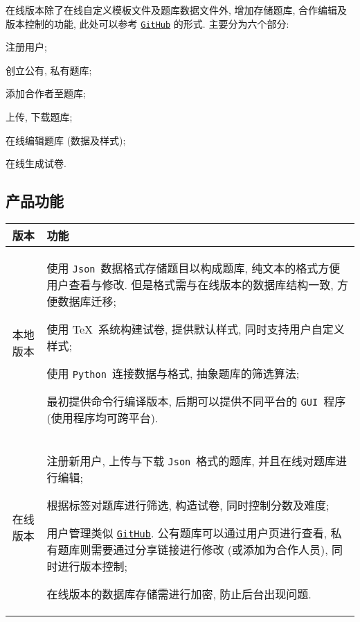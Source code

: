 \documentclass{ctexart}
\newcommand{\github}{\texttt{GitHub}}
\newcommand{\python}{\texttt{Python}}
\newcommand{\json}{\texttt{Json}}
\newcommand{\gui}{\texttt{GUI}}
\begin{document}
在线版本除了在线自定义模板文件及题库数据文件外, 增加存储题库, 合作编辑及版本控制的功能, 此处可以参考 \href{https://github.com/Iydon}{\github} 的形式. 主要分为六个部分: \begin{enumerate*}[label=\textbf{(\arabic*)}]
    \item 注册用户;
    \item 创立公有, 私有题库;
    \item 添加合作者至题库;
    \item 上传, 下载题库;
    \item 在线编辑题库 (数据及样式);
    \item 在线生成试卷.
\end{enumerate*}


\subsection{产品功能}
\begin{center}
    \begin{tabularx}{\textwidth}{cX}
        \toprule
            版本 & 功能 \\
        \midrule
        \rowcolor[HTML]{EFEFEF}
            本地版本 & \begin{itemize*}[itemjoin={\newline}]
                    \item 使用 \json\ 数据格式存储题目以构成题库, 纯文本的格式方便用户查看与修改. 但是格式需与在线版本的数据库结构一致, 方便数据库迁移;
                    \item 使用 \TeX\ 系统构建试卷, 提供默认样式, 同时支持用户自定义样式;
                    \item 使用 \python\ 连接数据与格式, 抽象题库的筛选算法;
                    \item 最初提供命令行编译版本, 后期可以提供不同平台的 \gui\ 程序 (使用程序均可跨平台).
                \end{itemize*} \\
            在线版本 & \begin{itemize*}[itemjoin={\newline}]
                    \item 注册新用户, 上传与下载 \json\ 格式的题库, 并且在线对题库进行编辑;
                    \item 根据标签对题库进行筛选, 构造试卷, 同时控制分数及难度;
                    \item 用户管理类似 \href{https://github.com/Iydon}{\github}. 公有题库可以通过用户页进行查看, 私有题库则需要通过分享链接进行修改 (或添加为合作人员), 同时进行版本控制;
                    \item 在线版本的数据库存储需进行加密, 防止后台出现问题.
                \end{itemize*} \\
        \bottomrule
    \end{tabularx}
\end{center}
\end{document}
